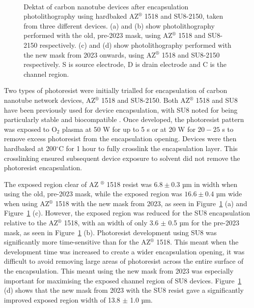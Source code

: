 \documentclass[
  a4paper,
]{scrbook}
\begin{document}
\begin{figure}
\begin{minipage}[t]{0.45\linewidth}
{{}

}

\end{minipage}%
%
\begin{minipage}[t]{0.01\linewidth}

{\centering 

~

}

\end{minipage}%

\caption{\label{fig-dektat-encapsulation}Dektat of carbon nanotube
devices after encapsulation photolithography using hardbaked
AZ\(^\circledR\) 1518 and SU8-2150, taken from three different devices.
(a) and (b) show photolithography performed with the old, pre-2023 mask,
using AZ\(^\circledR\) 1518 and SU8-2150 respectively. (c) and (d) show
photolithography performed with the new mask from 2023 onwards, using
AZ\(^\circledR\) 1518 and SU8-2150 respectively. S is source electrode,
D is drain electrode and C is the channel region.}

\end{figure}

Two types of photoresist were initially trialled for encapsulation of
carbon nanotube network devices, AZ\(^\circledR\) 1518 and SU8-2150.
Both AZ\(^\circledR\) 1518
\autocite{Murugathas2018,Murugathas2019a,Shkodra2021} and SU8 have been
previously used for device encapsulation, with SU8 noted for being
particularly stable and biocompatible
\autocite{Lee2006,Chen2021,Albarghouthi2022}. Once developed, the
photoresist pattern was exposed to O\(_2\) plasma at 50 W for up to 5 s
or at 20 W for \(20-25\) s to remove excess photoresist from the
encapsulation opening. Devices were then hardbaked at 200\(^\circ\)C for
1 hour to fully crosslink the encapsulation layer. This crosslinking
ensured subsequent device exposure to solvent did not remove the
photoresist encapsulation.

The exposed region clear of AZ \(^\circledR\) 1518 resist was
\(6.8 \pm 0.3\) µm in width when using the old, pre-2023 mask, while the
exposed region was \(16.6 \pm 0.4\) µm wide when using AZ\(^\circledR\)
1518 with the new mask from 2023, as seen in
Figure~\ref{fig-dektat-encapsulation} (a) and
Figure~\ref{fig-dektat-encapsulation} (c). However, the exposed region
was reduced for the SU8 encapsulation relative to the AZ\(^\circledR\)
1518, with an width of only 3.6 \(\pm\) 0.5 µm for the pre-2023 mask, as
seen in Figure~\ref{fig-dektat-encapsulation} (b). Photoresist
development using SU8 was significantly more time-sensitive than for the
AZ\(^\circledR\) 1518. This meant when the development time was
increased to create a wider encapsulation opening, it was difficult to
avoid removing large areas of photoresist across the entire surface of
the encapsulation. This meant using the new mask from 2023 was
especially important for maximising the exposed channel region of SU8
devices. Figure~\ref{fig-dektat-encapsulation} (d) shows that the new
mask from 2023 with the SU8 resist gave a significantly improved exposed
region width of 13.8 \(\pm\) 1.0 µm.
\end{document}
